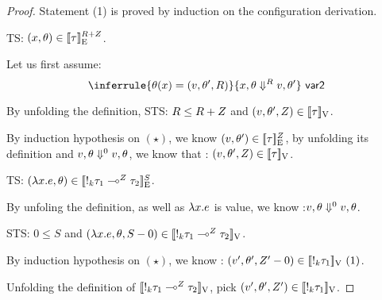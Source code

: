 \begin{proof}
  Statement (1) is proved by induction on the configuration derivation.\\
   

  TS: $(x, \env) \in  \lre{}{\adapt + \nnatA}{ \type}$.
  
  Let us first assume: \[   \inferrule{  \env(x)  =  (\valr, \env',  \adapt)  }{x,
      \env  \bigstep{\adapt} \valr, \env' }~\textsf{var2}  \]
  
  By unfolding the definition, STS: $\adapt \leq \adapt + \nnatA $  and $ (\valr, \env', \nnatA  ) \in \lrv{\type} $.

  By induction hypothesis on $(\star)$, we know $ (\valr, \env') \in
  \lre{}{\nnatA}{\type} $, by unfolding its definition and $ \valr,
  \env \bigstep{0} \valr, \env $,  we know that : $ (\valr, \env' ,
  \nnatA ) \in \lrv{\type}$.



   TS: $(\lambda x. \expr , \env) \in  \lre{}{S}{  \bang{\idx} \type_1\lto{\nnatA} \type_2 }$.
  
  By unfoling the definition, as well as $\lambda x. \expr$ is value, we know :$ \valr, \env \bigstep{0} \valr, \env$.
  
  STS: $0 \leq S $  and $ (\lambda x.\expr, \env, S-0  ) \in \lrv{ \bang{\idx} \type_1\lto{\nnatA} \type_2 } $.

  By induction hypothesis on $(\star)$,  we know : $ (\valr', \env'
  ,\nnatA' -0) \in \lrv{\bang{k} \type_1} ~(1) $.

  Unfolding the definition of $\lrv{ \bang{\idx} \type_1\lto{\nnatA}
    \type_2 }$,  pick $ (\valr', \env' ,\nnatA') \in \lrv{\bang{k}
    \type_1} $.  


\end{proof}
